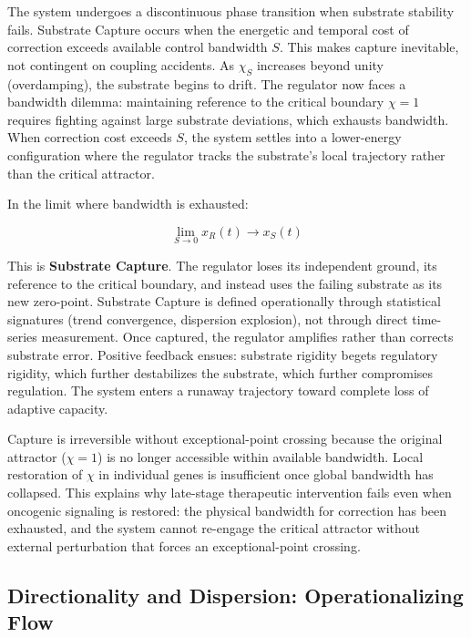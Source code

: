 \documentclass[11pt,letterpaper]{article}
\begin{document}
The system undergoes a discontinuous phase transition when substrate stability fails. Substrate Capture occurs when the energetic and temporal cost of correction exceeds available control bandwidth $S$. This makes capture inevitable, not contingent on coupling accidents. As $\chi_S$ increases beyond unity (overdamping), the substrate begins to drift. The regulator now faces a bandwidth dilemma: maintaining reference to the critical boundary $\chi = 1$ requires fighting against large substrate deviations, which exhausts bandwidth. When correction cost exceeds $S$, the system settles into a lower-energy configuration where the regulator tracks the substrate's local trajectory rather than the critical attractor.

In the limit where bandwidth is exhausted:

\begin{equation}
\lim_{S \to 0} x_R(t) \to x_S(t)
\label{eq:capture_limit}
\end{equation}

This is \textbf{Substrate Capture}. The regulator loses its independent ground, its reference to the critical boundary, and instead uses the failing substrate as its new zero-point. Substrate Capture is defined operationally through statistical signatures (trend convergence, dispersion explosion), not through direct time-series measurement. Once captured, the regulator amplifies rather than corrects substrate error. Positive feedback ensues: substrate rigidity begets regulatory rigidity, which further destabilizes the substrate, which further compromises regulation. The system enters a runaway trajectory toward complete loss of adaptive capacity.

Capture is irreversible without exceptional-point crossing because the original attractor ($\chi = 1$) is no longer accessible within available bandwidth. Local restoration of $\chi$ in individual genes is insufficient once global bandwidth has collapsed. This explains why late-stage therapeutic intervention fails even when oncogenic signaling is restored: the physical bandwidth for correction has been exhausted, and the system cannot re-engage the critical attractor without external perturbation that forces an exceptional-point crossing.

\subsection{Directionality and Dispersion: Operationalizing Flow}
\end{document}
